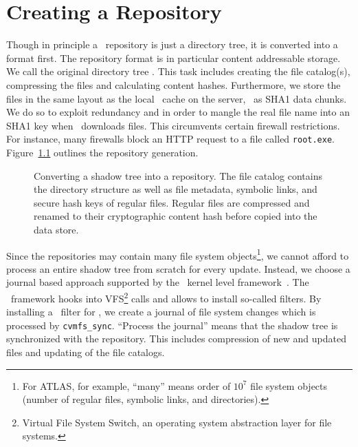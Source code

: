 \chapter{Creating a Repository}
\label{sct:createrepo}

Though in principle a \cvmfs\ repository is just a directory tree, it is converted into a  format first.
The repository format is in particular content addressable storage.
We call the original directory tree .
This task includes creating the file catalog(s), compressing the files and calculating content hashes.
Furthermore, we store the files in the same layout as the local \cvmfs\ cache on the server, \ie\ as SHA1 data chunks.
We do so to exploit redundancy and in order to mangle the real file name into an SHA1 key when \cvmfs\ downloads files.
This circumvents certain firewall restrictions.
For instance, many firewalls block an HTTP request to a file called \texttt{root.exe}.
Figure~\ref{fig:installwebserver} outlines the repository generation.

\begin{figure}
	\begin{center}
		
	\end{center}
	\caption{Converting a shadow tree into a repository. The file catalog contains the directory structure as well as file metadata, symbolic links, and secure hash keys of regular files. Regular files are compressed and renamed to their cryptographic content hash before copied into the data store.}
	\label{fig:installwebserver}
\end{figure}


Since the repositories may contain many file system objects\footnote{For ATLAS, for example, ``many'' means order of $10^7$ file system objects (\ie number of regular files, symbolic links, and directories).}, we cannot afford to process an entire shadow tree from scratch for every update.
Instead, we choose a journal based approach supported by the \redirfs\ kernel level framework~\cite{redirfs05}.
The \redirfs\ framework hooks into VFS\footnote{Virtual File System Switch, an operating system abstraction layer for file systems.} calls and allows to install so-called filters.
By installing a \cvmfs\ filter for \redirfs, we create a journal of file system changes which is processed by \texttt{cvmfs\_sync}.
``Process the journal'' means that the shadow tree is synchronized with the repository.
This includes compression of new and updated files and updating of the file catalogs.

